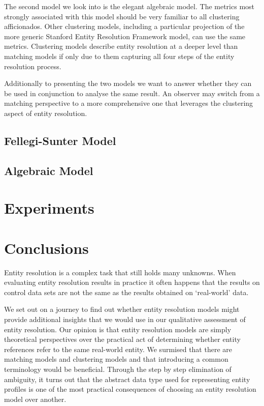 \documentclass[journal]{IEEEtran}
\begin{document}
    The second model we look into is the elegant algebraic model.
    The metrics most strongly associated with this model should be very familiar
    to all clustering afficionados.
    Other clustering models, including a particular projection of the more
    generic Stanford Entity Resolution Framework model, can use the same
    metrics.
    Clustering models describe entity resolution at a deeper level than matching
    models if only due to them capturing all four steps of the entity resolution
    process.

    Additionally to presenting the two models we want to answer whether they can
    be used in conjunction to analyse the same result.
    An observer may switch from a matching perspective to a more comprehensive
    one that leverages the clustering aspect of entity resolution.

    \subsection{Fellegi-Sunter Model}\label{subsec:Fellegi-Sunter Model}
    

    \subsection{Algebraic Model}\label{subsec:Algebraic Model}
    

    \section{Experiments}\label{sec:Experiments}
    

    \section{Conclusions}\label{sec:Conclusions}

    Entity resolution is a complex task that still holds many unknowns.
    When evaluating entity resolution results in practice it often happens that
    the results on control data sets are not the same as the results obtained
    on `real-world' data.
    
    We set out on a journey to find out whether entity resolution models might
    provide additional insights that we would use in our qualitative assessment
    of entity resolution.
    Our opinion is that entity resolution models are simply theoretical
    perspectives over the practical act of determining whether entity references
    refer to the same real-world entity.
    We surmised that there are matching models and clustering models and that
    introducing a common terminology would be beneficial.
    Through the step by step elimination of ambiguity, it turns out that the
    abstract data type used for representing entity profiles is one of the most
    practical consequences of choosing an entity resolution model over another.
\end{document}
